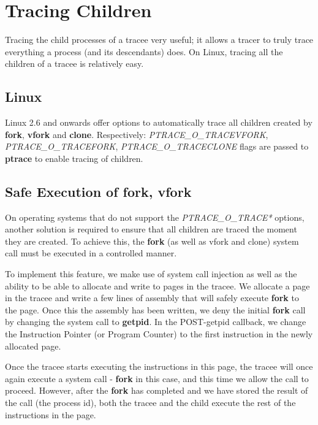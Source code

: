 \documentclass[a4paper, 10pt]{report}
\begin{document}
\section{Tracing Children}

Tracing the child processes of a tracee very useful; it allows a tracer to truly
trace everything a process (and its descendants) does. On Linux, tracing all the
children of a tracee is relatively easy.

\subsection{Linux}

Linux 2.6 and onwards offer options to automatically trace all children
created by \textbf{fork}, \textbf{vfork} and \textbf{clone}.
Respectively: \textit{PTRACE\_O\_TRACEVFORK}, \textit{PTRACE\_O\_TRACEFORK},
\textit{PTRACE\_O\_TRACECLONE} flags are passed to \textbf{ptrace} to enable
tracing of children.

\subsection{Safe Execution of fork, vfork}
\label{safe-fork}

On operating systems that do not support the \textit{PTRACE\_O\_TRACE*} options,
another solution is required to ensure that all children are traced the moment
they are created. To achieve this, the \textbf{fork}
(as well as vfork and clone) system call must be executed in a
controlled manner.

To implement this feature, we make use of system call injection as well as the
ability to be able to allocate and write to pages in the tracee. We allocate a
page in the tracee and write a few lines of assembly
 that will safely execute \textbf{fork} to the page.
Once this the assembly has been written, we deny the initial
\textbf{fork} call by changing the system call to \textbf{getpid}.
In the POST-getpid callback, we change the Instruction Pointer
(or Program Counter) to the first instruction in the newly allocated page.

Once the tracee starts executing the instructions in this
page, the tracee will once again execute a system call -
\textbf{fork} in this case, and this time we allow the call to proceed.
However, after the \textbf{fork} has completed
and we have stored the result of the call (the process id), both the tracee
and the child execute the rest of the instructions in the page.
\end{document}

